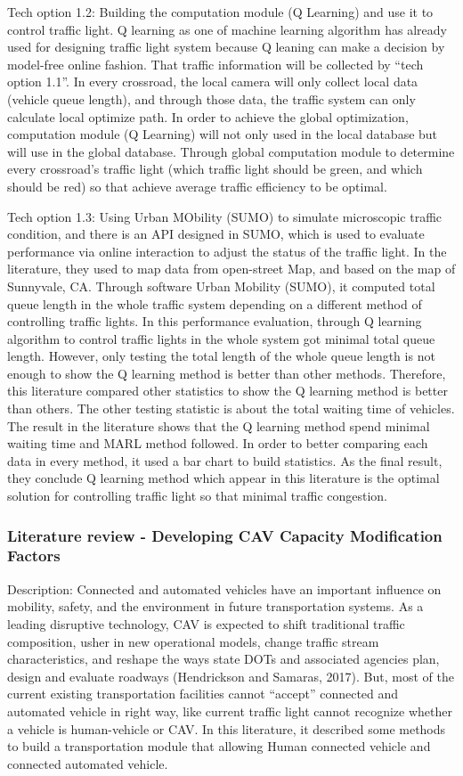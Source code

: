 \documentclass[onecolumn, draftclsnofoot,10pt, compsoc]{IEEEtran}
\begin{document}
Tech option 1.2: Building the computation module (Q Learning) and use it to control traffic light.
Q learning as one of machine learning algorithm has already used for designing traffic light system because Q leaning can make a decision by model-free online fashion.
That traffic information will be collected by “tech option 1.1”.
In every crossroad, the local camera will only collect local data (vehicle queue length), and through those data, the traffic system can only calculate local optimize path.
In order to achieve the global optimization, computation module (Q Learning) will not only used in the local database but will use in the global database.
Through global computation module to determine every crossroad’s traffic light (which traffic light should be green, and which should be red) so that achieve average traffic efficiency to be optimal.

Tech option 1.3: Using Urban MObility (SUMO) to simulate microscopic traffic condition, and there is an API designed in SUMO, which is used to evaluate performance via online interaction to adjust the status of the traffic light.
In the literature, they used to map data from open-street Map, and based on the map of Sunnyvale, CA.
Through software Urban Mobility (SUMO), it computed total queue length in the whole traffic system depending on a different method of controlling traffic lights.
In this performance evaluation, through Q learning algorithm to control traffic lights in the whole system got minimal total queue length.
However, only testing the total length of the whole queue length is not enough to show the Q learning method is better than other methods.
Therefore, this literature compared other statistics to show the Q learning method is better than others.
The other testing statistic is about the total waiting time of vehicles.
The result in the literature shows that the Q learning method spend minimal waiting time and MARL method followed.
In order to better comparing each data in every method, it used a bar chart to build statistics.
As the final result, they conclude Q learning method which appear in this literature is the optimal solution for controlling traffic light so that minimal traffic congestion.
\subsubsection{Literature review - Developing CAV Capacity Modification Factors}
Description: Connected and automated vehicles have an important influence on mobility, safety, and the environment in future transportation systems.
As a leading disruptive technology, CAV is expected to shift traditional traffic composition, usher in new operational models, change traffic stream characteristics, and reshape the ways state DOTs and associated agencies plan, design and evaluate roadways (Hendrickson and Samaras, 2017).
But, most of the current existing transportation facilities cannot “accept” connected and automated vehicle in right way, like current traffic light cannot recognize whether a vehicle is human-vehicle or CAV.
In this literature, it described some methods to build a transportation module that allowing Human connected vehicle and connected automated vehicle.
\end{document}
